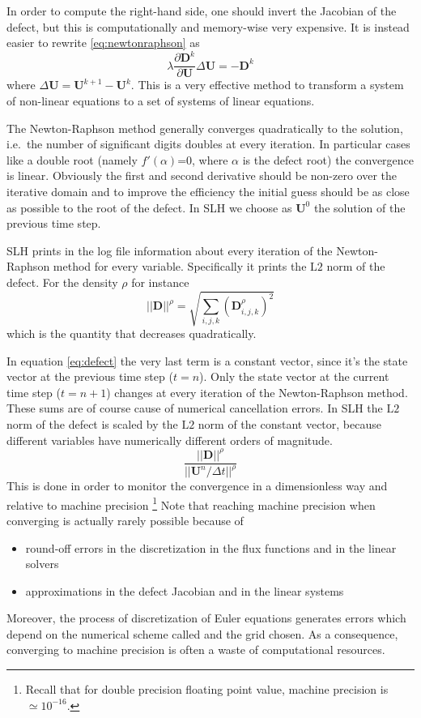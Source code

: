 In order to compute the right-hand side, one should invert the Jacobian of the defect, but this is computationally and memory-wise very expensive. It is instead easier to rewrite \ref{eq:newtonraphson} as 
\begin{equation}
	\lambda \frac{\partial \mathbf{D}^k}{\partial \mathbf{U}} \Delta \mathbf{U} = - \mathbf{D}^k
\end{equation}
where $\Delta \mathbf{U}=\mathbf{U}^{k+1} - \mathbf{U}^k$. This is a very effective method to transform a system of non-linear equations to a set of systems of linear equations.

The Newton-Raphson method generally converges quadratically to the solution, i.e.\ the number of significant digits doubles at every iteration. In particular cases like a double root (namely $f'(\alpha)$=0, where $\alpha$ is the defect root) the convergence is linear. Obviously the first and second derivative should be non-zero over the iterative domain and to improve the efficiency the initial guess should be as close as possible to the root of the defect. In SLH we choose as $\mathbf{U}^0$ the solution of the previous time step.

SLH prints in the log file information about every iteration of the Newton-Raphson method for every variable. Specifically it prints the $\mathrm{L2}$ norm of the defect. For the density $\rho$ for instance
\begin{equation}\label{eq:l2defect}
	||\mathbf{D}||^{\rho} = \sqrt{ \sum_{i, j, k} \left( \mathbf{D}^{\rho}_{i, j, k}  \right)^2}
\end{equation}
which is the quantity that decreases quadratically.

In equation \ref{eq:defect} the very last term is a constant vector, since it's the state vector at the previous time step ($t=n$). Only the state vector at the current time step ($t=n+1$) changes at every iteration of the Newton-Raphson method. These sums are of course cause of numerical cancellation errors. In SLH the $\mathrm{L2}$ norm of the defect is scaled by the $\mathrm{L2}$ norm of the constant vector, because different variables have numerically different orders of magnitude.
\begin{equation}
	\frac{||\mathbf{D}||^{\rho}}{||\mathbf{U}^n / \Delta t||^{\rho}}
\end{equation}
This is done in order to monitor the convergence in a dimensionless way and relative to machine precision \footnote{Recall that for double precision floating point value, machine precision is $\simeq 10^{-16}$. }
Note that reaching machine precision when converging is actually rarely possible because of
\begin{itemize}
	\item{round-off errors in the discretization in the flux functions and in the linear solvers}
	\item{approximations in the defect Jacobian and in the linear systems}
\end{itemize}
Moreover, the process of discretization of Euler equations generates errors which depend on the numerical scheme called and the grid chosen. As a consequence, converging to machine precision is often a waste of computational resources.
